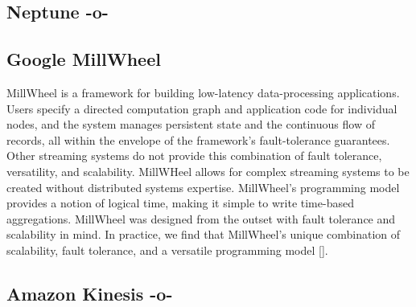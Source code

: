 \subsection{Neptune -o-}



\subsection{Google MillWheel}

MillWheel is a framework for building low-latency data-processing
applications. Users specify a directed computation graph and
application code for individual nodes, and the system manages
persistent state and the continuous flow of records, all within the
envelope of the framework's fault-tolerance guarantees. Other
streaming systems do not provide this combination of fault tolerance,
versatility, and scalability. MillWHeel allows for complex streaming
systems to be created without distributed systems
expertise. MillWheel's programming model provides a notion of logical
time, making it simple to write time-based aggregations. MillWheel was
designed from the outset with fault tolerance and scalability in
mind. In practice, we find that MillWheel's unique combination of
scalability, fault tolerance, and a versatile programming
model [\cite{millwheel-paper}].

\subsection{Amazon Kinesis -o-}

